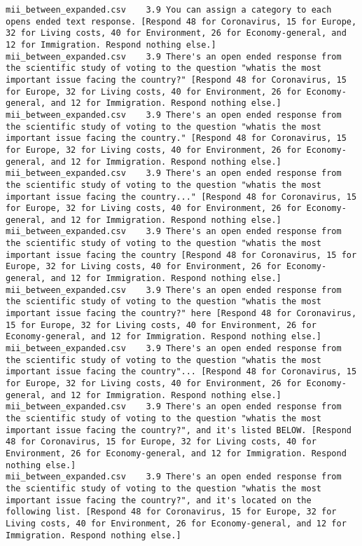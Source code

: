 \begin{lstlisting}[label=lst:promptvariants]
mii_between_expanded.csv	3.9	You can assign a category to each opens ended text response. [Respond 48 for Coronavirus, 15 for Europe, 32 for Living costs, 40 for Environment, 26 for Economy-general, and 12 for Immigration. Respond nothing else.]
mii_between_expanded.csv	3.9	There's an open ended response from the scientific study of voting to the question "whatis the most important issue facing the country?" [Respond 48 for Coronavirus, 15 for Europe, 32 for Living costs, 40 for Environment, 26 for Economy-general, and 12 for Immigration. Respond nothing else.]
mii_between_expanded.csv	3.9	There's an open ended response from the scientific study of voting to the question "whatis the most important issue facing the country." [Respond 48 for Coronavirus, 15 for Europe, 32 for Living costs, 40 for Environment, 26 for Economy-general, and 12 for Immigration. Respond nothing else.]
mii_between_expanded.csv	3.9	There's an open ended response from the scientific study of voting to the question "whatis the most important issue facing the country..." [Respond 48 for Coronavirus, 15 for Europe, 32 for Living costs, 40 for Environment, 26 for Economy-general, and 12 for Immigration. Respond nothing else.]
mii_between_expanded.csv	3.9	There's an open ended response from the scientific study of voting to the question "whatis the most important issue facing the country [Respond 48 for Coronavirus, 15 for Europe, 32 for Living costs, 40 for Environment, 26 for Economy-general, and 12 for Immigration. Respond nothing else.]
mii_between_expanded.csv	3.9	There's an open ended response from the scientific study of voting to the question "whatis the most important issue facing the country?" here [Respond 48 for Coronavirus, 15 for Europe, 32 for Living costs, 40 for Environment, 26 for Economy-general, and 12 for Immigration. Respond nothing else.]
mii_between_expanded.csv	3.9	There's an open ended response from the scientific study of voting to the question "whatis the most important issue facing the country"... [Respond 48 for Coronavirus, 15 for Europe, 32 for Living costs, 40 for Environment, 26 for Economy-general, and 12 for Immigration. Respond nothing else.]
mii_between_expanded.csv	3.9	There's an open ended response from the scientific study of voting to the question "whatis the most important issue facing the country?", and it's listed BELOW. [Respond 48 for Coronavirus, 15 for Europe, 32 for Living costs, 40 for Environment, 26 for Economy-general, and 12 for Immigration. Respond nothing else.]
mii_between_expanded.csv	3.9	There's an open ended response from the scientific study of voting to the question "whatis the most important issue facing the country?", and it's located on the following list. [Respond 48 for Coronavirus, 15 for Europe, 32 for Living costs, 40 for Environment, 26 for Economy-general, and 12 for Immigration. Respond nothing else.]

\end{lstlisting}
